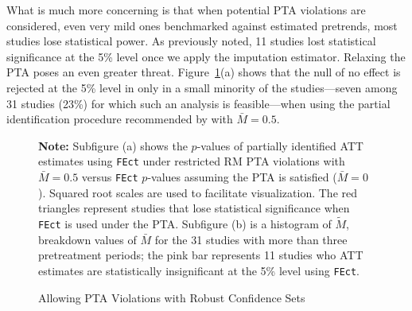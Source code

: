 \documentclass[12pt]{article}
\begin{document}
What is much more concerning is that when potential PTA violations are considered, even very mild ones benchmarked against estimated pretrends, most studies lose statistical power. As previously noted, 11 studies lost statistical significance at the 5\% level once we apply the imputation estimator. Relaxing the PTA poses an even greater threat. Figure~\ref{fg:power}(a) shows that the null of no effect is rejected at the 5\% level in only in a small minority of the studies---seven among 31 studies (23\%) for which such an analysis is feasible---when using the partial identification procedure recommended by \citet{rambachan2023more} with $\bar{M} = 0.5$. 
\begin{figure}[!ht]
  \caption{Allowing PTA Violations with Robust Confidence Sets}\label{fg:power}
  \centering
  \vspace{-0.5em}
  \begin{minipage}{1\linewidth}{
  \begin{center}  
  \vspace{-1em}
  \hspace{1em}
  \end{center}
  {\footnotesize\textbf{Note:} Subfigure (a) shows the $p$-values of partially identified ATT estimates using \texttt{FEct} under restricted RM PTA violations with $\bar{M} = 0.5$ versus \texttt{FEct} $p$-values assuming the PTA is satisfied ($\bar{M} = 0$). Squared root scales are used to facilitate visualization. The red triangles represent studies that lose statistical significance when \texttt{FEct} is used under the PTA. Subfigure (b) is a histogram of $\tilde{M}$, breakdown values of $\bar{M}$ for the 31 studies with more than three pretreatment periods; the pink bar represents 11 studies who ATT estimates are statistically insignificant at the 5\% level using \texttt{FEct}.}}

\end{minipage}
\end{figure}
\end{document}
